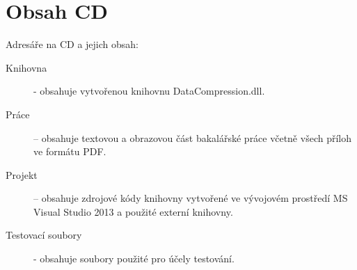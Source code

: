 \chapter{Obsah CD}
\label{prilohab}

Adresáře na CD a jejich obsah:

\begin{description}
\item [Knihovna] - obsahuje vytvořenou knihovnu DataCompression.dll.
\item [Práce] – obsahuje textovou a obrazovou část bakalářské práce včetně všech příloh ve formátu PDF.
\item [Projekt] – obsahuje zdrojové kódy knihovny vytvořené ve vývojovém prostředí MS Visual Studio 2013 a použité externí knihovny.
\item [Testovací soubory] - obsahuje soubory použité pro účely testování.
\end{description}